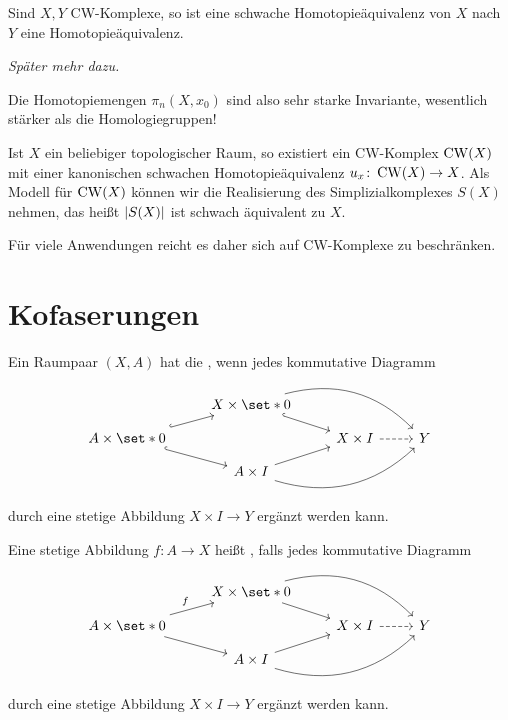 \begin{satz}[name={Whitehead}]
	Sind $X,Y$ CW-Komplexe, so ist eine schwache Homotopieäquivalenz von $X$ nach $Y$ eine Homotopieäquivalenz.
\end{satz}
\begin{beweis}
	\emph{Später mehr dazu.}
\end{beweis}

\begin{bemerkung}[{name=[Homotopiemengen als Invariante]}]
	Die Homotopiemengen $\pi_n(X,x_0)$ sind also sehr starke Invariante, wesentlich stärker als die Homologiegruppen!
\end{bemerkung}

\begin{bemerkung}[{name=[CW-Approximation]}]
	Ist $X$ ein beliebiger topologischer Raum, so existiert ein CW-Komplex $\CW(X)$ mit einer kanonischen schwachen Homotopieäquivalenz $u_x \colon \CW(X) \to X$.
	Als Modell für $\CW(X)$ können wir die Realisierung des Simplizialkomplexes $S(X)$ nehmen, das heißt $\abs*{S(X)}$ ist schwach äquivalent zu $X$.
\end{bemerkung}

\begin{bemerkung}[{name=[Beschränkung auf CW-Komplexe]}]
	Für viele Anwendungen reicht es daher sich auf CW-Komplexe zu beschränken.
\end{bemerkung}

\section{Kofaserungen} %
\label{sec:kofaserungen}

\begin{definition}[{name=[Homotopieerweiterungseigenschaft]}]
	Ein Raumpaar $(X,A)$ hat die , wenn jedes kommutative Diagramm  
	\[
		\begin{tikzcd}[row sep=small]
			& X \times \set*{0}  \drar[hook] \ar[rrd,bend left] \\
			A \times \set*{0} \urar[hook] \drar[hook] & & X \times I \rar[dashed] & Y \\
			& A \times I \urar \ar[urr,bend right]
		\end{tikzcd}
	\]
	durch eine stetige Abbildung $X \times I \to Y$ ergänzt werden kann.
\end{definition}

\begin{definition}[{name=[Kofaserung]}]
	Eine stetige Abbildung $f \colon A \to X$ heißt , falls jedes kommutative Diagramm
	\[
		\begin{tikzcd}[row sep=small]
			& X \times \set*{0}  \drar \ar[rrd,bend left] \\
			A \times \set*{0} \urar["f"] \drar & & X \times I \rar[dashed] & Y \\
			& A \times I \urar\ar[urr,bend right]
		\end{tikzcd}
	\] 
	durch eine stetige Abbildung $X \times I \to Y$ ergänzt werden kann.
\end{definition}


